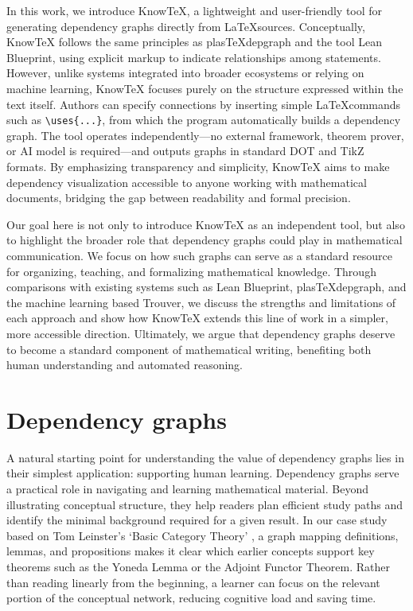 \documentclass{article}
\begin{document}
In this work, we introduce KnowTeX, a lightweight and user-friendly tool for generating dependency graphs directly from \LaTeX sources. Conceptually, KnowTeX follows the same principles as plasTeXdepgraph and the tool Lean Blueprint, using explicit markup to indicate relationships among statements.
However, unlike systems integrated into broader ecosystems or relying on machine learning, KnowTeX focuses purely on the structure expressed within the text itself. 
Authors can specify connections by inserting simple \LaTeX commands such as {\verb|\uses{...}|}, from which the program automatically builds a dependency graph. 
The tool operates independently—no external framework, theorem prover, or AI model is required—and outputs graphs in standard DOT and TikZ formats. 
By emphasizing transparency and simplicity, KnowTeX aims to make dependency visualization accessible to anyone working with mathematical documents, bridging the gap between readability and formal precision.

Our goal here is not only to introduce KnowTeX as an independent tool, but also to highlight the broader role that dependency graphs could play in mathematical communication. 
We focus on how such graphs can serve as a standard resource for organizing, teaching, and formalizing mathematical knowledge. Through comparisons with existing systems such as  Lean Blueprint, plasTeXdepgraph, and the machine learning based Trouver, we discuss the strengths and limitations of each approach and show how KnowTeX extends this line of work in a simpler, more accessible direction. Ultimately, we argue that dependency graphs deserve to become a standard component of mathematical writing, benefiting both human understanding and automated reasoning.



\section{Dependency graphs}
A natural starting point for understanding the value of dependency graphs lies in their simplest application: supporting human learning. 
Dependency graphs serve a practical role in navigating and learning mathematical material. Beyond illustrating conceptual structure, they help readers plan efficient study paths and identify the minimal background required for a given result. 
In our case study based on Tom Leinster’s `Basic Category Theory' \cite{leinster2014}, a graph mapping definitions, lemmas, and propositions makes it clear which earlier concepts support key theorems such as the Yoneda Lemma or the Adjoint Functor Theorem. Rather than reading linearly from the beginning, a learner can focus
on the relevant portion of the conceptual network, reducing cognitive load and saving time.
\end{document}
